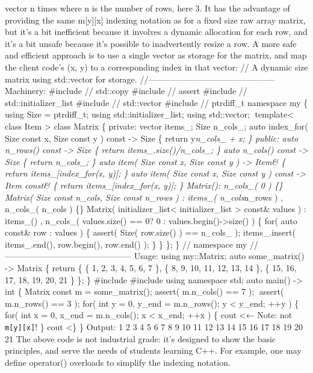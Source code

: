 vector n times where n is the number of rows, here 3. It has the
advantage of providing the same m{[}y{]}{[}x{]} indexing notation as for
a ﬁxed size raw array matrix, but it's a bit ineﬃcient because it
involves a dynamic allocation for each row, and it's a bit unsafe
because it's possible to inadvertently resize a row. A more safe and
eﬃcient approach is to use a single vector as storage for the matrix,
and map the client code's (x, y) to a corresponding index in that
vector: // A dynamic size matrix using std::vector for storage.
//--------------------------------------------- Machinery: \#include //
std::copy \#include // assert \#include // std::initializer\_list
\#include // std::vector \#include // ptrdiff\_t namespace my \{ using
Size = ptrdiff\_t; using std::initializer\_list; using std::vector;
template\textless{} class Item \textgreater{} class Matrix \{ private:
vector items\_; Size n\_cols\_; auto index\_for( Size const x, Size
const y ) const -\textgreater{} Size \{ return y\emph{n\_cols\_ + x; \}
public: auto n\_rows() const -\textgreater{} Size \{ return
items\_.size()/n\_cols\_; \} auto n\_cols() const -\textgreater{} Size
\{ return n\_cols\_; \} auto item( Size const x, Size const y )
-\textgreater{} Item\& \{ return items\_{[}index\_for(x, y){]}; \} auto
item( Size const x, Size const y ) const -\textgreater{} Item const\& \{
return items\_{[}index\_for(x, y){]}; \} Matrix(): n\_cols\_( 0 ) \{\}
Matrix( Size const n\_cols, Size const n\_rows ) : items\_(
n\_cols}n\_rows ) , n\_cols\_( n\_cols ) \{\} Matrix(
initializer\_list\textless{} initializer\_list \textgreater{} const\&
values ) : items\_() , n\_cols\_( values.size() == 0? 0 :
values.begin()-\textgreater size() ) \{ for( auto const\& row : values )
\{ assert( Size( row.size() ) == n\_cols\_ ); items\_.insert(
items\_.end(), row.begin(), row.end() ); \} \} \}; \} // namespace my
//--------------------------------------------- Usage: using my::Matrix;
auto some\_matrix() -\textgreater{} Matrix \{ return \{ \{ 1, 2, 3, 4,
5, 6, 7 \}, \{ 8, 9, 10, 11, 12, 13, 14 \}, \{ 15, 16, 17, 18, 19, 20,
21 \} \}; \} \#include \#include using namespace std; auto main()
-\textgreater{} int \{ Matrix const m = some\_matrix(); assert(
m.n\_cols() == 7 ); assert( m.n\_rows() == 3 ); for( int y = 0, y\_end
= m.n\_rows(); y \textless{} y\_end; ++y ) \{ for( int x = 0, x\_end =
m.n\_cols(); x \textless{} x\_end; ++x ) \{ cout \textless← Note: not
\passthrough{\lstinline!m[y][x]!}! \} cout \textless\} \} Output: 1 2 3
4 5 6 7 8 9 10 11 12 13 14 15 16 17 18 19 20 21 The above code is not
industrial grade: it's designed to show the basic principles, and serve
the needs of students learning C++. For example, one may deﬁne
operator() overloads to simplify the indexing notation.
